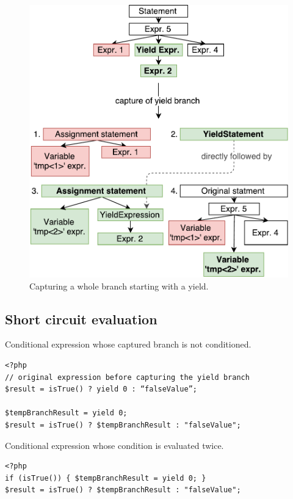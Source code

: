 \begin{figure}[h]
	\centering	
	\includegraphics[scale=0.75]{../img/5_2_yieldCapturing}	
	\caption{Capturing a whole branch starting with a yield.}
	\label{fig5.2:CaptureYield}
\end{figure}

\subsection{Short circuit evaluation}

\begin{listing}[H]
\caption{Conditional expression whose captured branch is not conditioned.}
\label{list5.3:CondNotGuarded}
\begin{verbatim}
<?php
// original expression before capturing the yield branch
$result = isTrue() ? yield 0 : “falseValue”;

$tempBranchResult = yield 0;
$result = isTrue() ? $tempBranchResult : "falseValue";
\end{verbatim}
\end{listing}

\begin{listing}[H]
\caption{Conditional expression whose condition is evaluated twice.}
\label{list5.3:CondTwice}
\begin{verbatim}
<?php
if (isTrue()) { $tempBranchResult = yield 0; }
$result = isTrue() ? $tempBranchResult : "falseValue";
\end{verbatim}
\end{listing}

